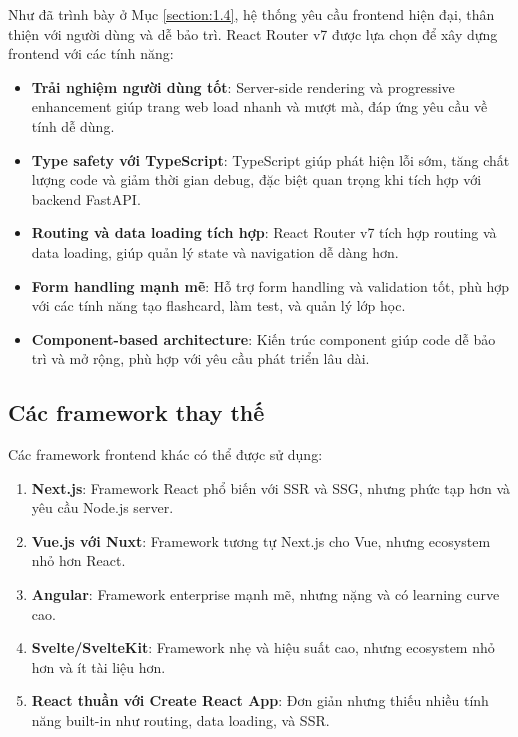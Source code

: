 \documentclass[../DoAn.tex]{subfiles}
\begin{document}
Như đã trình bày ở Mục \ref{section:1.4}, hệ thống yêu cầu frontend hiện đại, thân thiện với người dùng và dễ bảo trì. React Router v7 được lựa chọn để xây dựng frontend với các tính năng:

\begin{itemize}
    \item \textbf{Trải nghiệm người dùng tốt}: Server-side rendering và progressive enhancement giúp trang web load nhanh và mượt mà, đáp ứng yêu cầu về tính dễ dùng.
    
    \item \textbf{Type safety với TypeScript}: TypeScript giúp phát hiện lỗi sớm, tăng chất lượng code và giảm thời gian debug, đặc biệt quan trọng khi tích hợp với backend FastAPI.
    
    \item \textbf{Routing và data loading tích hợp}: React Router v7 tích hợp routing và data loading, giúp quản lý state và navigation dễ dàng hơn.
    
    \item \textbf{Form handling mạnh mẽ}: Hỗ trợ form handling và validation tốt, phù hợp với các tính năng tạo flashcard, làm test, và quản lý lớp học.
    
    \item \textbf{Component-based architecture}: Kiến trúc component giúp code dễ bảo trì và mở rộng, phù hợp với yêu cầu phát triển lâu dài.
\end{itemize}

\subsection{Các framework thay thế}

Các framework frontend khác có thể được sử dụng:

\begin{enumerate}
    \item \textbf{Next.js}: Framework React phổ biến với SSR và SSG, nhưng phức tạp hơn và yêu cầu Node.js server.
    
    \item \textbf{Vue.js với Nuxt}: Framework tương tự Next.js cho Vue, nhưng ecosystem nhỏ hơn React.
    
    \item \textbf{Angular}: Framework enterprise mạnh mẽ, nhưng nặng và có learning curve cao.
    
    \item \textbf{Svelte/SvelteKit}: Framework nhẹ và hiệu suất cao, nhưng ecosystem nhỏ hơn và ít tài liệu hơn.
    
    \item \textbf{React thuần với Create React App}: Đơn giản nhưng thiếu nhiều tính năng built-in như routing, data loading, và SSR.
\end{enumerate}
\end{document}
